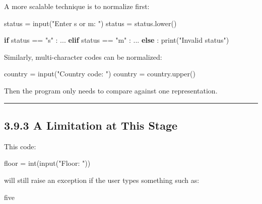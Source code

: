 \documentclass[
  11pt,
  a4paper,
]{article}
\newenvironment{Shaded}{}{}
\newcommand{\BuiltInTok}[1]{\textcolor[rgb]{0.00,0.50,0.00}{#1}}
\newcommand{\ControlFlowTok}[1]{\textcolor[rgb]{0.00,0.44,0.13}{\textbf{#1}}}
\newcommand{\NormalTok}[1]{#1}
\newcommand{\OperatorTok}[1]{\textcolor[rgb]{0.40,0.40,0.40}{#1}}
\newcommand{\StringTok}[1]{\textcolor[rgb]{0.25,0.44,0.63}{#1}}
\begin{document}
A more scalable technique is to normalize first:

\begin{Shaded}
\begin{Highlighting}[]
\NormalTok{status }\OperatorTok{=} \BuiltInTok{input}\NormalTok{(}\StringTok{"Enter s or m: "}\NormalTok{)}
\NormalTok{status }\OperatorTok{=}\NormalTok{ status.lower()}

\ControlFlowTok{if}\NormalTok{ status }\OperatorTok{==} \StringTok{"s"}\NormalTok{ :}
\NormalTok{    ...}
\ControlFlowTok{elif}\NormalTok{ status }\OperatorTok{==} \StringTok{"m"}\NormalTok{ :}
\NormalTok{    ...}
\ControlFlowTok{else}\NormalTok{ :}
    \BuiltInTok{print}\NormalTok{(}\StringTok{"Invalid status"}\NormalTok{)}
\end{Highlighting}
\end{Shaded}

Similarly, multi-character codes can be normalized:

\begin{Shaded}
\begin{Highlighting}[]
\NormalTok{country }\OperatorTok{=} \BuiltInTok{input}\NormalTok{(}\StringTok{"Country code: "}\NormalTok{)}
\NormalTok{country }\OperatorTok{=}\NormalTok{ country.upper()}
\end{Highlighting}
\end{Shaded}

Then the program only needs to compare against one representation.

\begin{center}\rule{0.5\linewidth}{0.5pt}\end{center}

\subsection{3.9.3 A Limitation at This
Stage}\label{a-limitation-at-this-stage}

This code:

\begin{Shaded}
\begin{Highlighting}[]
\NormalTok{floor }\OperatorTok{=} \BuiltInTok{int}\NormalTok{(}\BuiltInTok{input}\NormalTok{(}\StringTok{"Floor: "}\NormalTok{))}
\end{Highlighting}
\end{Shaded}

will still raise an exception if the user types something such as:

\begin{Shaded}
\begin{Highlighting}[]
\NormalTok{five}
\end{Highlighting}
\end{Shaded}
\end{document}

